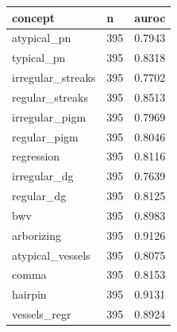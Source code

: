 \begin{tabular}{lll}
\hline
concept & n & auroc \\
\hline
atypical\_pn & 395 & 0.7943 \\
typical\_pn & 395 & 0.8318 \\
irregular\_streaks & 395 & 0.7702 \\
regular\_streaks & 395 & 0.8513 \\
irregular\_pigm & 395 & 0.7969 \\
regular\_pigm & 395 & 0.8046 \\
regression & 395 & 0.8116 \\
irregular\_dg & 395 & 0.7639 \\
regular\_dg & 395 & 0.8125 \\
bwv & 395 & 0.8983 \\
arborizing & 395 & 0.9126 \\
atypical\_vessels & 395 & 0.8075 \\
comma & 395 & 0.8153 \\
hairpin & 395 & 0.9131 \\
vessels\_regr & 395 & 0.8924 \\
\hline
\end{tabular}
